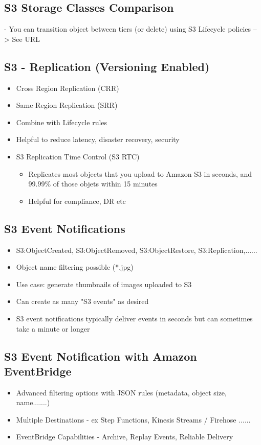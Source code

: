 \subsection{S3 Storage Classes Comparison}

- You can transition object between tiers (or delete) using S3 Lifecycle policies
--> See URL

\subsection{S3 - Replication (Versioning Enabled)}
\begin{itemize}
    \item Cross Region Replication (CRR)
    \item Same Region Replication (SRR)
    \item Combine with Lifecycle rules
    \item Helpful to reduce latency, disaster recovery, security
    \item S3 Replication Time Control (S3 RTC)
    \begin{itemize}
        \item Replicates most objects that you upload to Amazon S3 in seconds, and 99.99\% of those objets within 15 minutes
        \item Helpful for compliance, DR etc
    \end{itemize}
\end{itemize}

\subsection{S3 Event Notifications}
\begin{itemize}
    \item S3:ObjectCreated, S3:ObjectRemoved, S3:ObjectRestore, S3:Replication,......
    \item Object name filtering possible (*.jpg)
    \item Use case: generate thumbnails of images uploaded to S3
    \item Can create as many "S3 events" as desired
    \item S3 event notifications typically deliver events in seconds but can sometimes take a minute or longer
\end{itemize}

\subsection{S3 Event Notification with Amazon EventBridge}
\begin{itemize}
    \item Advanced filtering options with JSON rules (metadata, object size, name.......)
    \item Multiple Destinations - ex Step Functions, Kinesis Streams / Firehose ......
    \item EventBridge Capabilities - Archive, Replay Events, Reliable Delivery
\end{itemize}

